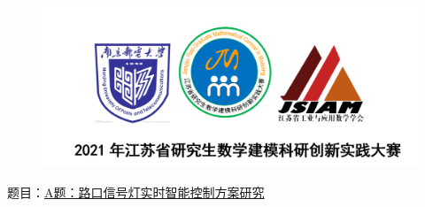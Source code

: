 \documentclass[a4paper,12pt]{ctexart}
\begin{document}
    \begin{figure}[h]
        \centering
        \includegraphics[scale=0.6]{figures/封面.png}
    \end{figure}
    \begin{center}
        题目：\uline{A题：路口信号灯实时智能控制方案研究}
    \end{center}
    
    \newpage
    
    
    
    
    

    \newpage
    
    
\end{document}
